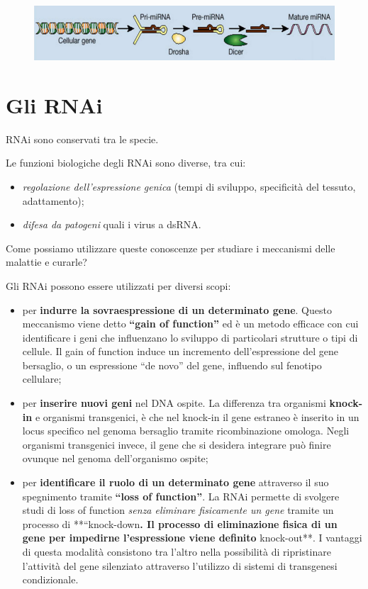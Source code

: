 \documentclass[11pt]{book}
\begin{document}
\begin{figure}[htp]
\centering
\includegraphics[scale=1.00]{img/67_miRNA.png}
\caption{}
\label{mirna}
\end{figure}

\section{Gli RNAi}\label{gli-rnai}

RNAi sono conservati tra le specie.

Le funzioni biologiche degli RNAi sono diverse, tra cui:

\begin{itemize}
\itemsep1pt\parskip0pt
\item
  \emph{regolazione dell'espressione genica} (tempi di sviluppo,
  specificità del tessuto, adattamento);
\item
  \emph{difesa da patogeni} quali i virus a dsRNA.
\end{itemize}

Come possiamo utilizzare queste conoscenze per studiare i meccanismi
delle malattie e curarle?

Gli RNAi possono essere utilizzati per diversi scopi:

\begin{itemize}
\itemsep1pt\parskip0pt
\item
  per \textbf{indurre la sovraespressione di un determinato gene}.
  Questo meccanismo viene detto \textbf{``gain of function''} ed è un
  metodo efficace con cui identificare i geni che influenzano lo
  sviluppo di particolari strutture o tipi di cellule. Il gain of
  function induce un incremento dell'espressione del gene bersaglio, o
  un espressione ``de novo'' del gene, influendo sul fenotipo cellulare;
\item
  per \textbf{inserire nuovi geni} nel DNA ospite. La differenza tra
  organismi \textbf{knock-in} e organismi transgenici, è che nel
  knock-in il gene estraneo è inserito in un locus specifico nel genoma
  bersaglio tramite ricombinazione omologa. Negli organismi transgenici
  invece, il gene che si desidera integrare può finire ovunque nel
  genoma dell'organismo ospite;
\item
  per \textbf{identificare il ruolo di un determinato gene} attraverso
  il suo spegnimento tramite \textbf{``loss of function''}. La RNAi
  permette di svolgere studi di loss of function \emph{senza eliminare
  fisicamente un gene} tramite un processo di **``knock-down\textbf{. Il
  processo di eliminazione fisica di un gene per impedirne l'espressione
  viene definito }knock-out**. I vantaggi di questa modalità consistono
  tra l'altro nella possibilità di ripristinare l'attività del gene
  silenziato attraverso l'utilizzo di sistemi di transgenesi
  condizionale.
\end{itemize}
\end{document}
